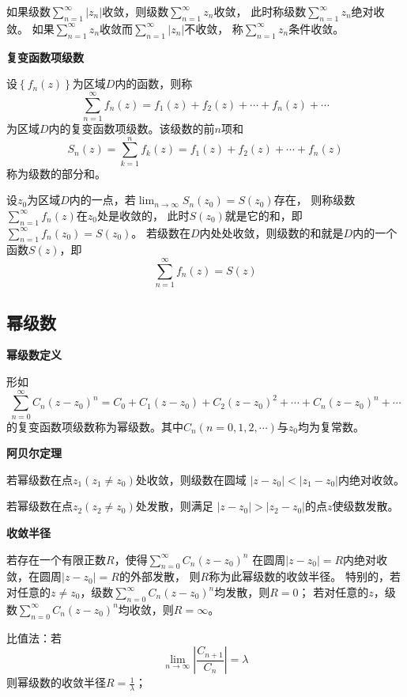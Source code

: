 \documentclass[a4paper,12pt]{article}
\begin{document}
如果级数$\sum_{n=1}^\infty \left|z_n\right|$收敛，则级数$\sum_{n=1}^\infty z_n$收敛，
此时称级数$\sum_{n=1}^\infty z_n$绝对收敛。
如果$\sum_{n=1}^\infty z_n$收敛而$\sum_{n=1}^\infty \left|z_n\right|$不收敛，
称$\sum_{n=1}^\infty z_n$条件收敛。

\noindent
\textbf{复变函数项级数}

设$\left\{f_n\left(z\right)\right\}$为区域$D$内的函数，则称
$$
\sum_{n=1}^\infty f_n\left(z\right)=f_1\left(z\right)+f_2\left(z\right)+\cdots+f_n\left(z\right)+\cdots
$$
为区域$D$内的复变函数项级数。该级数的前$n$项和
$$
S_n\left(z\right)=\sum_{k=1}^n f_k\left(z\right)=f_1\left(z\right)+f_2\left(z\right)+\cdots+f_n\left(z\right)
$$
称为级数的部分和。

设$z_0$为区域$D$内的一点，若$\lim_{n\to\infty}S_n\left(z_0\right)=S\left(z_0\right)$存在，
则称级数$\sum_{n=1}^\infty f_n\left(z\right)$在$z_0$处是收敛的，
此时$S\left(z_0\right)$就是它的和，即$\sum_{n=1}^\infty f_n\left(z_0\right)=S\left(z_0\right)$。
若级数在$D$内处处收敛，则级数的和就是$D$内的一个函数$S\left(z\right)$，即
$$
\sum_{n=1}^\infty f_n\left(z\right)=S\left(z\right)
$$

\subsection{幂级数}

\noindent
\textbf{幂级数定义}

形如
$$
\sum_{n=0}^\infty C_n\left(z-z_0\right)^n
=C_0+C_1\left(z-z_0\right)+C_2\left(z-z_0\right)^2+\cdots+C_n\left(z-z_0\right)^n+\cdots
$$
的复变函数项级数称为幂级数。其中$C_n\left(n=0,1,2,\cdots\right)$与$z_0$均为复常数。

\noindent
\textbf{阿贝尔定理}

若幂级数在点$z_1\left(z_1\ne z_0\right)$处收敛，则级数在圆域
$\left|z-z_0\right|<\left|z_1-z_0\right|$内绝对收敛。

若幂级数在点$z_2\left(z_2\ne z_0\right)$处发散，则满足
$\left|z-z_0\right|>\left|z_2-z_0\right|$的点$z$使级数发散。

\noindent
\textbf{收敛半径}

若存在一个有限正数$R$，使得$\sum_{n=0}^\infty C_n\left(z-z_0\right)^n$
在圆周$\left|z-z_0\right|=R$内绝对收敛，在圆周$\left|z-z_0\right|=R$的外部发散，
则$R$称为此幂级数的收敛半径。
特别的，若对任意的$z\ne z_0$，级数$\sum_{n=0}^\infty C_n\left(z-z_0\right)^n$均发散，则$R=0$；
若对任意的$z$，级数$\sum_{n=0}^\infty C_n\left(z-z_0\right)^n$均收敛，则$R=\infty$。

比值法：若
$$
\lim_{n\to\infty}\left|\frac{C_{n+1}}{C_n}\right|=\lambda
$$
则幂级数的收敛半径$R=\frac1\lambda$；
\end{document}
